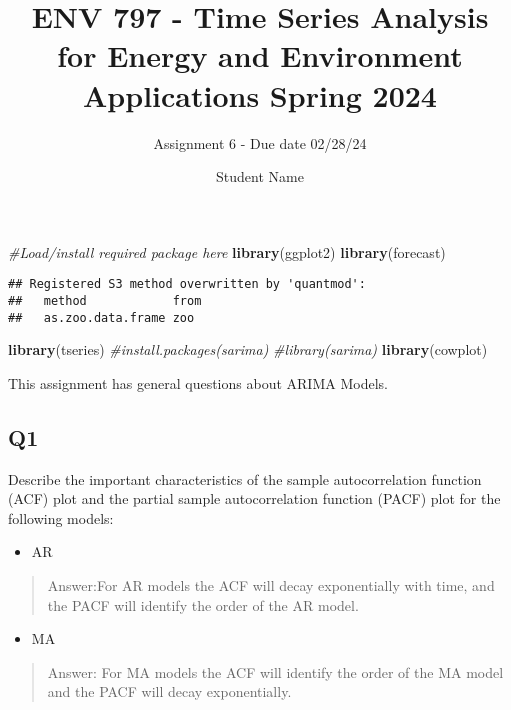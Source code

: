 \documentclass[
]{article}
\title{ENV 797 - Time Series Analysis for Energy and Environment
Applications \textbar{} Spring 2024}
\subtitle{Assignment 6 - Due date 02/28/24}
\author{Student Name}
\date{}
\newenvironment{Shaded}{\begin{snugshade}}{\end{snugshade}}
\newcommand{\CommentTok}[1]{\textcolor[rgb]{0.56,0.35,0.01}{\textit{#1}}}
\newcommand{\FunctionTok}[1]{\textcolor[rgb]{0.13,0.29,0.53}{\textbf{#1}}}
\newcommand{\NormalTok}[1]{#1}
\providecommand{\tightlist}{%
  \setlength{\itemsep}{0pt}\setlength{\parskip}{0pt}}
\begin{document}
\maketitle

\begin{Shaded}
\begin{Highlighting}[]
\CommentTok{\#Load/install required package here}
\FunctionTok{library}\NormalTok{(ggplot2)}
\FunctionTok{library}\NormalTok{(forecast)}
\end{Highlighting}
\end{Shaded}

\begin{verbatim}
## Registered S3 method overwritten by 'quantmod':
##   method            from
##   as.zoo.data.frame zoo
\end{verbatim}

\begin{Shaded}
\begin{Highlighting}[]
\FunctionTok{library}\NormalTok{(tseries)}
\CommentTok{\#install.packages(sarima)}
\CommentTok{\#library(sarima)}
\FunctionTok{library}\NormalTok{(cowplot)}
\end{Highlighting}
\end{Shaded}

This assignment has general questions about ARIMA Models.

\hypertarget{q1}{%
\subsection{Q1}\label{q1}}

Describe the important characteristics of the sample autocorrelation
function (ACF) plot and the partial sample autocorrelation function
(PACF) plot for the following models:

\begin{itemize}
\tightlist
\item
  AR
\end{itemize}

\begin{quote}
Answer:For AR models the ACF will decay exponentially with time, and the
PACF will identify the order of the AR model.
\end{quote}

\begin{itemize}
\tightlist
\item
  MA
\end{itemize}

\begin{quote}
Answer: For MA models the ACF will identify the order of the MA model
and the PACF will decay exponentially.
\end{quote}
\end{document}
